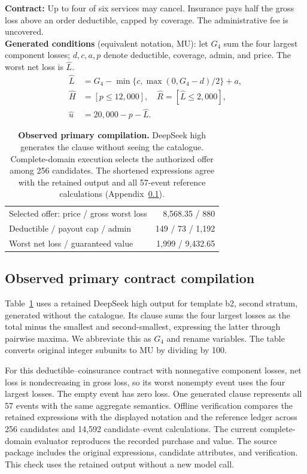 \documentclass[11pt]{article}
\begin{document}
\begin{table}[t]
\centering\small
\begin{minipage}{\columnwidth}
\textbf{Contract:} Up to four of six services may cancel. Insurance pays half the gross loss above an order deductible, capped by coverage. The administrative fee is uncovered.\\[3pt]
\textbf{Generated conditions} (equivalent notation, MU): let $G_4$ sum the four largest component losses; $d,c,a,p$ denote deductible, coverage, admin, and price. The worst net loss is $\widehat L$.
\[
\begin{aligned}
\widehat L&=G_4-\min\{c,\max(0,G_4-d)/2\}+a,\\
\widehat H&=[p\le12{,}000],\quad
\widehat R=[\widehat L\le2{,}000],\\
\widehat u&=20{,}000-p-\widehat L.
\end{aligned}
\]
\end{minipage}
\begin{tabular}{@{}lr@{}}
\toprule
Selected offer: price / gross worst loss & 8,568.35 / 880\\
Deductible / payout cap / admin & 149 / 73 / 1,192\\
Worst net loss / guaranteed value & 1,999 / 9,432.65\\
\bottomrule
\end{tabular}
\caption{\textbf{Observed primary compilation.} DeepSeek high generates the clause without seeing the catalogue. Complete-domain execution selects the authorized offer among 256 candidates. The shortened expressions agree with the retained output and all 57-event reference calculations (Appendix~\ref{app:primary-trace}).}
\label{tab:primary-trace}
\end{table}

\subsection{Observed primary contract compilation}
\label{app:primary-trace}
Table~\ref{tab:primary-trace} uses a retained DeepSeek high output for template b2, second stratum, generated without the catalogue. Its clause sums the four largest losses as the total minus the smallest and second-smallest, expressing the latter through pairwise maxima. We abbreviate this as $G_4$ and rename variables. The table converts original integer subunits to MU by dividing by 100.

For this deductible--coinsurance contract with nonnegative component losses, net loss is nondecreasing in gross loss, so its worst nonempty event uses the four largest losses. The empty event has zero loss. One generated clause represents all 57 events with the same aggregate semantics. Offline verification compares the retained expressions with the displayed notation and the reference ledger across 256 candidates and 14,592 candidate--event calculations. The current complete-domain evaluator reproduces the recorded purchase and value. The source package includes the original expressions, candidate attributes, and verification. This check uses the retained output without a new model call.
\end{document}
